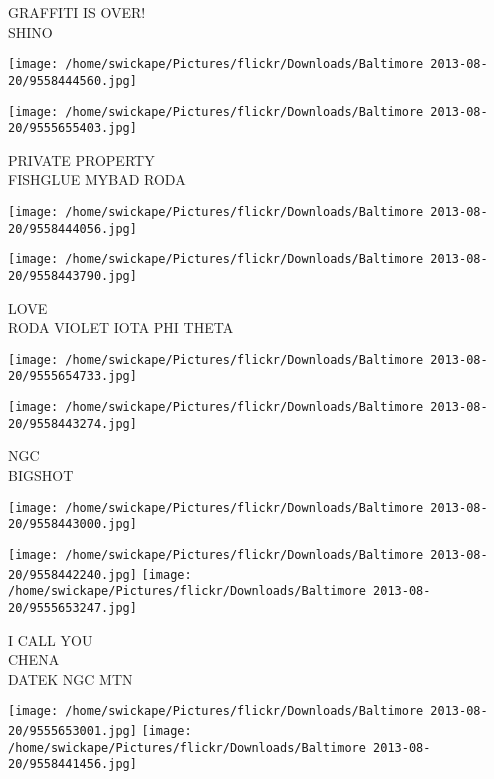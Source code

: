 \documentclass[10pt,letterpaper]{article}
\begin{document}
GRAFFITI IS OVER!\\
SHINO\\
\pagebreak

\texttt{[image: /home/swickape/Pictures/flickr/Downloads/Baltimore 2013-08-20/9558444560.jpg]}

\vspace{0.25in}
\texttt{[image: /home/swickape/Pictures/flickr/Downloads/Baltimore 2013-08-20/9555655403.jpg]}

PRIVATE PROPERTY\\
FISHGLUE MYBAD RODA\\
\pagebreak

\texttt{[image: /home/swickape/Pictures/flickr/Downloads/Baltimore 2013-08-20/9558444056.jpg]}

\vspace{0.25in}
\texttt{[image: /home/swickape/Pictures/flickr/Downloads/Baltimore 2013-08-20/9558443790.jpg]}

LOVE\\
RODA VIOLET IOTA PHI THETA\\
\pagebreak

\texttt{[image: /home/swickape/Pictures/flickr/Downloads/Baltimore 2013-08-20/9555654733.jpg]}

\vspace{0.25in}
\texttt{[image: /home/swickape/Pictures/flickr/Downloads/Baltimore 2013-08-20/9558443274.jpg]}

NGC\\
BIGSHOT\\
\pagebreak

\texttt{[image: /home/swickape/Pictures/flickr/Downloads/Baltimore 2013-08-20/9558443000.jpg]}

\vspace{0.25in}
\texttt{[image: /home/swickape/Pictures/flickr/Downloads/Baltimore 2013-08-20/9558442240.jpg]}
\texttt{[image: /home/swickape/Pictures/flickr/Downloads/Baltimore 2013-08-20/9555653247.jpg]}

I CALL YOU\\
CHENA\\
DATEK NGC MTN\\
\pagebreak

\texttt{[image: /home/swickape/Pictures/flickr/Downloads/Baltimore 2013-08-20/9555653001.jpg]}
\texttt{[image: /home/swickape/Pictures/flickr/Downloads/Baltimore 2013-08-20/9558441456.jpg]}
\end{document}
